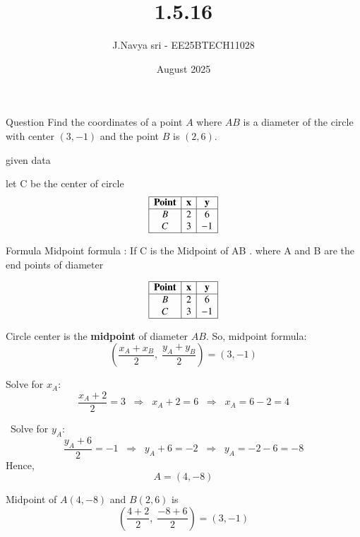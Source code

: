 \documentclass{beamer}
\title %
{1.5.16}
\date{August  2025}
\author %
{J.Navya sri - EE25BTECH11028}
\begin{document}
\frame{\titlepage}
\begin{frame}{Question}
Find the coordinates of a point $A$ where $AB$ is a diameter of the circle with center  
$(3, -1)$ and the point $B$ is $(2, 6)$.


\end{frame}
    
\begin{frame}{given data}
 
let C be the center of circle
\[
\begin{array}{|c|c|c|c|}
\hline
\textbf{Point} & \textbf{x} & \textbf{y}\\
\hline
B & 2 & 6 \\
C & 3 & -1 \\
\hline
\end{array}
\]

   
\end{frame}

\begin{frame}{Formula}
  Midpoint formula : If C is the Midpoint of AB . where A and B are the end points of diameter

\end{frame}
 
\[
\begin{array}{|c|c|c|c|}
\hline
\textbf{Point} & \textbf{x} & \textbf{y}\\
\hline
B & 2 & 6 \\
C & 3 & -1 \\
\hline
\end{array}
\]

\begin{enumerate}
 Circle center is the \textbf{midpoint} of diameter $AB$.  
    So, midpoint formula:  
    \[
    \left( \frac{x_A + x_B}{2}, \; \frac{y_A + y_B}{2} \right) = (3, -1)
    \]

 Solve for $x_A$:  
    \[
    \frac{x_A + 2}{2} = 3 \;\;\Rightarrow\;\; x_A + 2 = 6 \;\;\Rightarrow\;\; x_A = 6 - 2 = 4
    \]

    \ Solve for $y_A$:  
    \[
    \frac{y_A + 6}{2} = -1 \;\;\Rightarrow\;\; y_A + 6 = -2 \;\;\Rightarrow\;\; y_A = -2 - 6 = -8
    \]
Hence,  
    \[
    A = (4, -8)
    \]
\end{enumerate}

Midpoint of $A(4, -8)$ and $B(2, 6)$ is  
\[
\left( \frac{4+2}{2}, \; \frac{-8+6}{2} \right) = (3, -1)

\]

 
\end{document}
